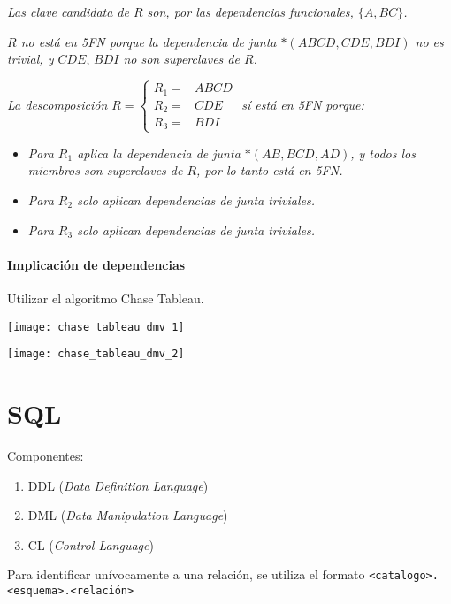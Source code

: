 \documentclass[a4paper, twoside]{article}
\begin{document}
\emph{Las clave candidata de $R$ son, por las dependencias funcionales,
$\{A,BC\}$.}

\emph{$R$ no está en 5FN porque la dependencia de junta $*\left(ABCD,CDE,BDI\right)$
no es trivial, y $CDE,\, BDI$ no son superclaves de $R$.}

\emph{La descomposición $R=\begin{cases}
R_{1}= & ABCD\\
R_{2}= & CDE\\
R_{3}= & BDI
\end{cases}$ sí está en 5FN porque:}
\begin{itemize}
\item \emph{Para $R_{1}$ aplica la dependencia de junta $*\left(AB,BCD,AD\right)$,
y todos los miembros son superclaves de $R$, por lo tanto está en
5FN.}
\item \emph{Para $R_{2}$ solo aplican dependencias de junta triviales.}
\item \emph{Para $R_{3}$ solo aplican dependencias de junta triviales.}
\end{itemize}

\subsection{Implicación de dependencias}

Utilizar el algoritmo Chase Tableau.

\noindent \begin{center}
\texttt{[image: chase\_tableau\_dmv\_1]}
\par\end{center}

\noindent \begin{center}
\texttt{[image: chase\_tableau\_dmv\_2]}
\par\end{center}

\pagebreak{}


\part{SQL}

Componentes: 
\begin{enumerate}
\item DDL (\emph{Data Definition Language})
\item DML (\emph{Data Manipulation Language})
\item CL (\emph{Control Language})
\end{enumerate}
Para identificar unívocamente a una relación, se utiliza el formato
\texttt{<catalogo>.<esquema>.<relación>}
\end{document}
